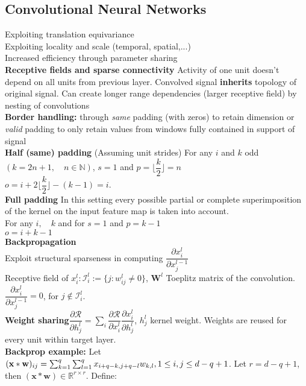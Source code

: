 \subsection*{Convolutional Neural Networks}
Exploiting translation equivariance\\
Exploiting locality and scale (temporal, spatial,...)\\
Increased efficiency through parameter sharing \\
\textbf{Receptive fields and sparse connectivity} Activity of one unit doesn't depend on all units from previous layer. Convolved signal \textbf{inherits} topology of original signal. Can create longer range dependencies (larger receptive field) by nesting of convolutions \\
\textbf{Border handling:} through \textit{same} padding (with zeros) to retain dimension or \textit{valid} padding to only retain values from windows fully contained in support of signal\\
\textbf{Half (same) padding}
(Assuming unit strides) For any $i$ and $k$ odd $(k=2n+1, \quad n\in\mathbb{N})$, $s=1$ and $p=\lfloor\dfrac{k}{2}\rfloor = n$\\
$o=i+2\lfloor\dfrac{k}{2}\rfloor - (k-1) = i$.\\
\textbf{Full padding} In this setting every possible partial or complete superimposition of the kernel on the input feature map is taken into account.\\
For any $i,\quad k$ and for $s=1$ and $p=k-1$\\
$o= i + k-1$\\
\textbf{Backpropagation}\\
Exploit structural sparseness in computing $\dfrac{\partial x_i^l}{\partial x_j^{l-1}}$\\
Receptive field of $x_i^l: \mathcal{I}_i^l:=\{j:w_{ij}^l\neq 0 \}$, $\mathbf{W}^l$ Toeplitz matrix of the convolution. $\dfrac{\partial x_i^l}{\partial x_j^{l-1}}=0$, for $j\notin \mathcal{I}_i^l$.\\
\textbf{Weight sharing}$\dfrac{\partial\mathcal{R}}{\partial h_j^l} = \sum_i\dfrac{\partial\mathcal{R}}{\partial x_i^l}\dfrac{\partial x_i^l}{\partial h_j^l}$, $h_j^l$ kernel weight. Weights are reused for every unit within target layer.\\
\textbf{Backprop example:} Let $(\mathbf x*\mathbf w)_{ij}=\sum_{k=1}^q\sum_{l=1}^qx_{i+q-k,j+q-l}w_{k,l}, \\1\leq i,j\leq d-q+1$. Let $r=d-q+1$, then $(\mathbf x*\mathbf w)\in\mathbb R^{r\times r}$. Define:\\
